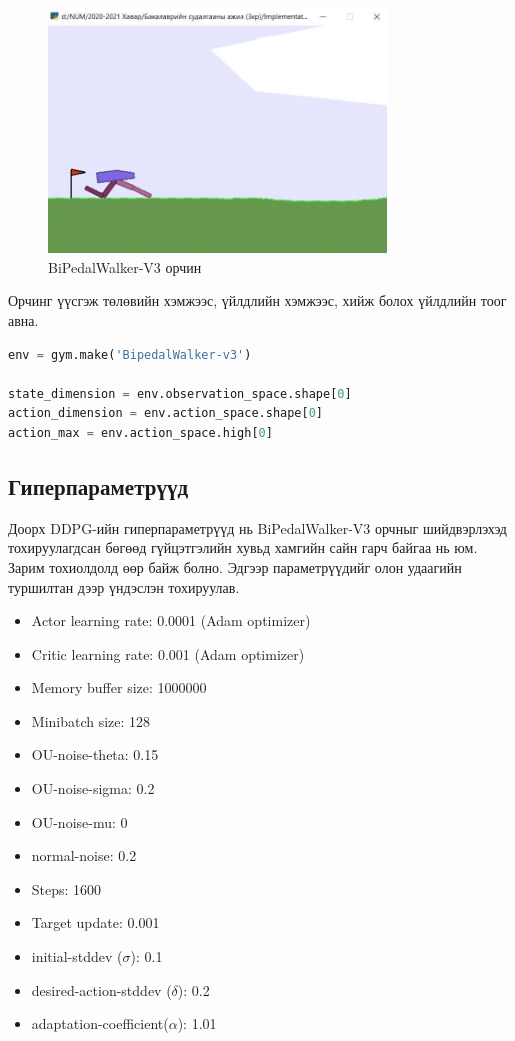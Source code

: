 \documentclass[12pt,A4]{report}
\begin{document}
\begin{figure}[H]
\centering
\includegraphics[width=0.8\textwidth]{./images/bipedalwalker}
\caption{BiPedalWalker-V3 орчин}
\end{figure}

Орчинг үүсгэж төлөвийн хэмжээс, үйлдлийн хэмжээс, хийж болох үйлдлийн тоог авна.

\begin{lstlisting}[language=Python, caption=Орчин үүсгэх, frame=single]
env = gym.make('BipedalWalker-v3')

state_dimension = env.observation_space.shape[0]
action_dimension = env.action_space.shape[0]
action_max = env.action_space.high[0]
\end{lstlisting}

\subsection{Гиперпараметрүүд}

Доорх DDPG-ийн гиперпараметрүүд нь BiPedalWalker-V3 орчныг шийдвэрлэхэд тохируулагдсан бөгөөд гүйцэтгэлийн хувьд хамгийн сайн гарч байгаа нь юм. Зарим тохиолдолд өөр байж болно. Эдгээр параметрүүдийг олон удаагийн туршилтан дээр үндэслэн тохируулав.

\begin{itemize}
	\item Actor learning rate: 0.0001 (Adam optimizer)
	\item Critic learning rate: 0.001 (Adam optimizer)
	\item Memory buffer size: 1000000
	\item Minibatch size: 128
	\item OU-noise-theta: 0.15
	\item OU-noise-sigma: 0.2
	\item OU-noise-mu: 0
	\item normal-noise: 0.2
	\item Steps: 1600
	\item Target update: 0.001
	\item initial-stddev ($\sigma$): 0.1
	\item desired-action-stddev ($\delta$): 0.2
	\item adaptation-coefficient($\alpha$): 1.01
\end{itemize}
\end{document}
